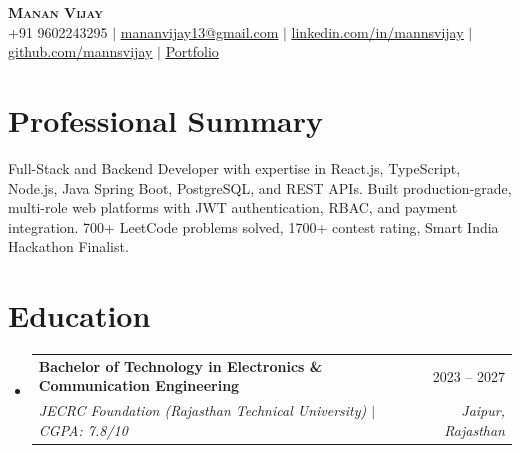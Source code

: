 \documentclass[letterpaper,11pt]{article}
\makeatletter
\newcommand{\resumeSubheading}[4]{
  \vspace{-2pt}\item
    \begin{tabular*}{0.97\textwidth}[t]{l@{\extracolsep{\fill}}r}
      \textbf{#1} & #2 \\
      \textit{\small#3} & \textit{\small #4} \\
    \end{tabular*}\vspace{-7pt}
}
\newcommand{\resumeSubHeadingListStart}{\begin{itemize}[leftmargin=0.15in, label={}]}
\newcommand{\resumeSubHeadingListEnd}{\end{itemize}}
\makeatother
\begin{document}

\begin{center}
    \textbf{\Huge \scshape Manan Vijay} \\ \vspace{3pt}
    \small
    +91 9602243295 $|$
    \href{mailto:mananvijay13@gmail.com}{\underline{mananvijay13@gmail.com}} $|$
    \href{https://www.linkedin.com/in/mannsvijay/}{\underline{linkedin.com/in/mannsvijay}} $|$
    \href{https://github.com/mannsvijay}{\underline{github.com/mannsvijay}} $|$
    \href{https://portfolio-mannsvijays-projects.vercel.app/}{\underline{Portfolio}}
\end{center}

\section{Professional  Summary}
\small{
Full-Stack and Backend Developer with expertise in React.js, TypeScript, Node.js, Java Spring Boot, PostgreSQL, and REST APIs. Built production-grade, multi-role web platforms with JWT authentication, RBAC, and payment integration. 700+ LeetCode problems solved, 1700+ contest rating, Smart India Hackathon Finalist.
}
\section{Education}
  \resumeSubHeadingListStart
    \resumeSubheading
      {Bachelor of Technology in Electronics \& Communication Engineering}{2023 --  2027}
      {JECRC Foundation (Rajasthan Technical University) $|$ CGPA: 7.8/10}{Jaipur, Rajasthan}
  \resumeSubHeadingListEnd
\end{document}
